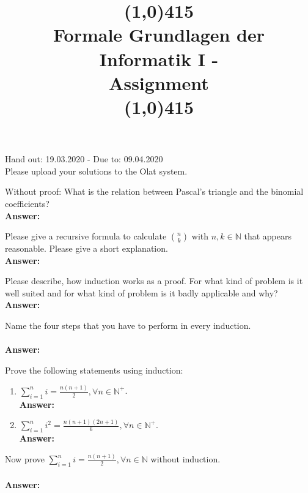 \documentclass{exercise}
\title{ \line(1,0){415} \\ Formale Grundlagen der Informatik I -\\ Assignment \theexercise\\
\line(1,0){415}}
\newcommand{\answer}[1]{\vspace{0.25cm}\\\textbf{Answer:}~#1\vspace{0.25cm}}
\begin{document}
\maketitle

\begin{center}
	Hand out: 19.03.2020 - Due to: 09.04.2020\\\vspace{1em}
  Please upload your solutions to the Olat system.
\end{center}

   Without proof: What is the relation between Pascal's triangle and the binomial coefficients?
  \answer{

  }

   Please give a recursive formula to calculate $\binom{n}{k}$ with $n,k\in\mathbb{N}$ that appears reasonable. Please give a short explanation.
  \answer{

  }

   Please describe, how induction works as a proof. For what kind of problem is it well suited and for what kind of problem is it badly applicable and why?
  \answer{

  }

   Name the four steps that you have to perform in every induction.\\
  \answer{

  }
    
   Prove the following statements using induction:
    \begin{enumerate}
      \item $\sum\limits_{i=1}^n i = \frac{n(n+1)}{2}, \forall n \in \mathbb{N}^{+}$.
      \answer{

      }
      
      \item $\sum\limits_{i=1}^n i^2 = \frac{n(n+1)(2n+1)}{6}, \forall n \in \mathbb{N}^{+}$.
      \answer{

      }
      
    \end{enumerate}

   Now prove $\sum\limits_{i=1}^n i = \frac{n(n+1)}{2}, \forall n \in \mathbb{N}$ without induction.\\
  \answer{

  }
\end{document}
